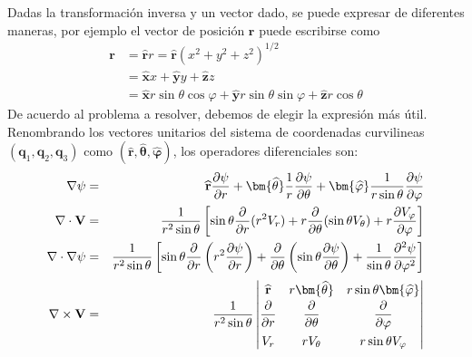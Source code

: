 Dadas la transformación inversa y un vector dado, se puede expresar de diferentes maneras, por ejemplo el vector de posición $\mathbf{r}$ puede escribirse como
\[ \begin{split}
\mathbf{r} &= \mathbf{\widehat{r}} r = \mathbf{\widehat{r}} \left( x^{2} + y^{2} + z^{2} \right)^{1/2} \\
&= \mathbf{\widehat{x}} x + \mathbf{\widehat{y}} y + \mathbf{\widehat{z}} z  \\
&= \mathbf{\widehat{x}} r \sin \theta \cos \varphi + \mathbf{\widehat{y}} r \sin \theta \sin \varphi + \mathbf{\widehat{z}} r \cos \theta    
\end{split}\]
De  acuerdo al problema a resolver, debemos de elegir la expresión más útil.
\\
Renombrando los vectores unitarios del sistema de coordenadas curvilineas $(\mathbf{q}_{1}, \mathbf{q}_{2}, \mathbf{q}_{3}) $ como $(\mathbf{\widehat{r}}, \bm{\widehat{\theta}}, \bm{\widehat{\varphi}})$, los operadores diferenciales son:
\begin{eqnarray}
\nabla \psi &=& \mathbf{\widehat{r}} \dfrac{\partial \psi}{\partial r} + \bm{\widehat{\theta}} \dfrac{1}{r} \dfrac{\partial \psi}{\partial \theta} + \bm{\widehat{\varphi}} \dfrac{1}{r \sin \theta} \dfrac{\partial \psi}{\partial \varphi} \\
\mathbf{\nabla \cdot V} &=& \dfrac{1}{r^{2} \sin \theta} \left[ \sin \theta \dfrac{\partial}{\partial r}(r^{2} V_{r}) + r \dfrac{\partial}{\partial \theta} (\sin \theta V_{\theta}) + r \dfrac{\partial V_{\varphi}}{\partial \varphi} \right] \\
\mathbf{\nabla \cdot \nabla \psi} &=& \dfrac{1}{r^{2} \sin \theta} \left[  \sin \theta \dfrac{\partial}{\partial r} \left(  r^{2} \dfrac{\partial \psi}{\partial r} \right) + \dfrac{\partial}{\partial \theta} \left( \sin \theta \dfrac{\partial \psi}{\partial \theta} \right) + \dfrac{1}{\sin \theta} \dfrac{\partial^{2} \psi}{\partial \varphi^{2}}   \right] \\
\mathbf{\nabla \times V} &=& \dfrac{1}{r^{2} \sin \theta}
\renewcommand\arraystretch{1.5} \begin{vmatrix}
\mathbf{\widehat{r}} & r \bm{\widehat{\theta}} & r \sin \theta \bm{\widehat{\varphi}} \\
\dfrac{\partial}{\partial r} & \dfrac{\partial}{\partial \theta} & \dfrac{\partial}{\partial \varphi} \\
V_{r} & r V_{\theta} & r \sin \theta V_{\varphi}
\end{vmatrix}
\end{eqnarray}
